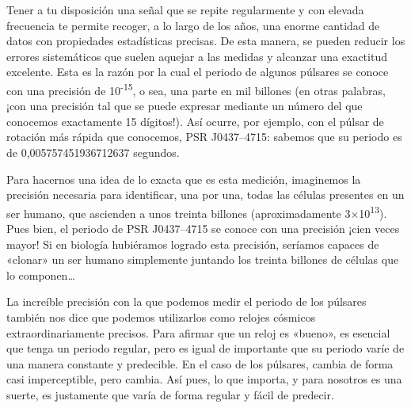 Tener a tu disposición una señal que se repite regularmente y con elevada frecuencia te permite recoger, a lo largo de los años, una enorme cantidad de datos con propiedades estadísticas precisas. De esta manera, se pueden reducir los errores sistemáticos que suelen aquejar a las medidas y alcanzar una exactitud excelente. Esta es la razón por la cual el periodo de algunos púlsares se conoce con una precisión de 10\textsuperscript{-15}, o sea, una parte en mil billones (en otras palabras, ¡con una precisión tal que se puede expresar mediante un número del que conocemos exactamente 15 dígitos!). Así ocurre, por ejemplo, con el púlsar de rotación más rápida que conocemos, PSR J0437--4715: sabemos que su periodo es de 0,005757451936712637 segundos.

Para hacernos una idea de lo exacta que es esta medición, imaginemos la precisión necesaria para identificar, una por una, todas las células presentes en un ser humano, que ascienden a unos treinta billones (aproximadamente 3×10\textsuperscript{13}). Pues bien, el periodo de PSR J0437--4715 se conoce con una precisión ¡cien veces mayor! Si en biología hubiéramos logrado esta precisión, seríamos capaces de «clonar» un ser humano simplemente juntando los treinta billones de células que lo componen…

La increíble precisión con la que podemos medir el periodo de los púlsares también nos dice que podemos utilizarlos como relojes cósmicos extraordinariamente precisos. Para afirmar que un reloj es «bueno», es esencial que tenga un periodo regular, pero es igual de importante que su periodo varíe de una manera constante y predecible. En el caso de los púlsares, cambia de forma casi imperceptible, pero cambia. Así pues, lo que importa, y para nosotros es una suerte, es justamente que varía de forma regular y fácil de predecir.


